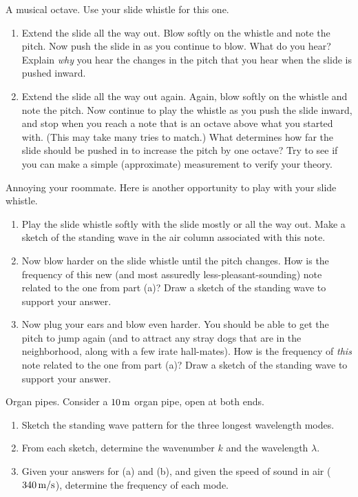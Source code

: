 \begin{aproblem}{A musical octave.}  
  Use your slide whistle for this one.
  \begin{enumerate}
  \item Extend the slide all the way out.  Blow softly on the whistle
    and note the pitch.  Now push the slide in as you continue to
    blow.  What do you hear?  Explain {\it why} you hear the changes
    in the pitch that you hear when the slide is pushed inward.
  \item Extend the slide all the way out again.  Again, blow softly on
    the whistle and note the pitch.  Now continue to play the whistle
    as you push the slide inward, and stop when you reach a note that
    is an octave above what you started with. (This may take many
    tries to match.)  What determines how far the slide should be
    pushed in to increase the pitch by one octave?  Try to see if you
    can make a simple (approximate) measurement to verify your theory.
  \end{enumerate}
\end{aproblem}


\begin{aproblem}{Annoying your roommate.} 
  Here is another opportunity to play with your slide whistle.
  \begin{enumerate}
  \item Play the slide whistle softly with the slide mostly or all the
    way out.  Make a sketch of the standing wave in the air column
    associated with this note.
  \item Now blow harder on the slide whistle until the pitch changes.
    How is the frequency of this new (and most assuredly
    less-pleasant-sounding) note related to the one from part (a)?
    Draw a sketch of the standing wave to support your answer.
  \item Now plug your ears and blow even harder.  You should be able
    to get the pitch to jump again (and to attract any stray dogs that
    are in the neighborhood, along with a few irate hall-mates). How
    is the frequency of {\it this} note related to the one from part
    (a)?  Draw a sketch of the standing wave to support your answer.
  \end{enumerate}
\end{aproblem}

\newpage

\begin{aproblem}{Organ pipes.}  
  Consider a $10\,\mbox{m}$ organ pipe, open at both ends.
  \begin{enumerate}
  \item Sketch the standing wave pattern for the three longest
    wavelength modes.
  \item From each sketch, determine the wavenumber $k$ and the
    wavelength $\lambda$.
  \item Given your answers for (a) and (b), and given the speed of
    sound in air ($340\,\mbox{m/s}$), determine the frequency of each
    mode.
  \end{enumerate}
  \label{prob:OrganPipes}
\end{aproblem}


